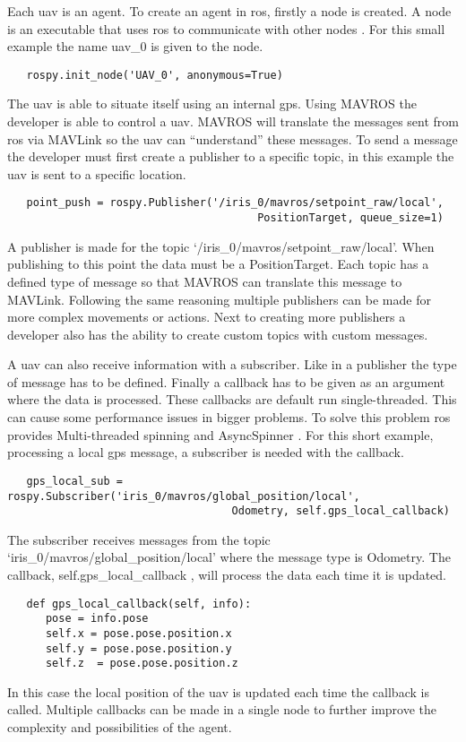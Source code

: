 
Each \acs{uav} is an agent. To create an agent in \acs{ros}, firstly a node is created. 
A node is an executable that uses \acs{ros} to communicate with other nodes \cite{ros:nodes}. For this small example the name \acs{uav}\_0 is given to the node.

\begin{verbatim}
   rospy.init_node('UAV_0', anonymous=True)
\end{verbatim}

The \acs{uav} is able to situate itself using an internal \acs{gps}. 
Using MAVROS the developer is able to control a \acs{uav}.  
MAVROS will translate the messages sent from \acs{ros} via MAVLink so the \acs{uav} can “understand” these messages. 
To send a message the developer must first create a publisher to a specific topic, in this example the \acs{uav} is sent to a specific location.

\begin{verbatim}
   point_push = rospy.Publisher('/iris_0/mavros/setpoint_raw/local',
                                       PositionTarget, queue_size=1)
\end{verbatim}

A publisher is made for the topic ‘/iris\_0/mavros/setpoint\_raw/local’. When publishing to this point the data must be a PositionTarget. 
Each topic has a defined type of message so that MAVROS can translate this message to MAVLink. Following the same reasoning multiple publishers 
can be made for more complex movements or actions. Next to creating more publishers a developer also has the ability to create custom topics with custom messages. 

A \acs{uav} can also receive information with a subscriber. Like in a publisher the type of message has to be defined. 
Finally a callback has to be given as an argument where the data is processed. These callbacks are default run single-threaded. 
This can cause some performance issues in bigger problems. To solve this problem \acs{ros} provides Multi-threaded spinning and AsyncSpinner \cite{ros:callbacks}. 
For this short example, processing a local \acs{gps} message, a subscriber is needed with the callback. 

\begin{verbatim}
   gps_local_sub = rospy.Subscriber('iris_0/mavros/global_position/local',
                                   Odometry, self.gps_local_callback)
\end{verbatim}

\newpage
The subscriber receives messages from the topic ‘iris\_0/mavros/global\_position/local' where the message type is Odometry. 
The callback, self.gps\_local\_callback , will process the data each time it is updated. 

\begin{verbatim}
   def gps_local_callback(self, info):
      pose = info.pose
      self.x = pose.pose.position.x
      self.y = pose.pose.position.y
      self.z  = pose.pose.position.z
\end{verbatim}

In this case the local position of the \acs{uav} is updated each time the callback is called. Multiple callbacks can be made in a single node to further 
improve the complexity and possibilities of the agent. 
